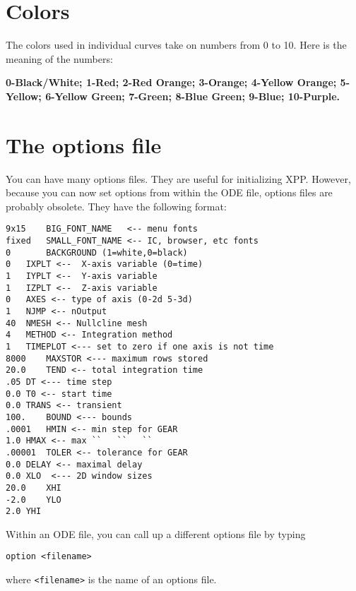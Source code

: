 \documentclass{article}
\newcommand{\bvb}{\begin{verbatim}}
\begin{document}
\section{Colors}
The colors used in individual curves take on numbers from 0 to 10. Here is
the meaning of the numbers:

{\bf 0-Black/White; 1-Red; 2-Red Orange; 3-Orange;
4-Yellow Orange; 5-Yellow; 6-Yellow Green; 7-Green; 8-Blue Green; 9-Blue;
10-Purple.}

\section{The options file}
\label{optfiles}
You can have many options files.  They are useful for initializing
XPP. However, because you can now set options from within the ODE
file, options files are probably obsolete. They have the following format:
\bvb
9x15    BIG_FONT_NAME   <-- menu fonts
fixed   SMALL_FONT_NAME <-- IC, browser, etc fonts
0       BACKGROUND (1=white,0=black)
0	IXPLT <--  X-axis variable (0=time)
1	IYPLT <--  Y-axis variable
1	IZPLT <--  Z-axis variable
0	AXES <-- type of axis (0-2d 5-3d)
1	NJMP <-- nOutput
40	NMESH <-- Nullcline mesh
4	METHOD <-- Integration method
1	TIMEPLOT <--- set to zero if one axis is not time
8000	MAXSTOR <--- maximum rows stored
20.0	TEND <-- total integration time
.05	DT <--- time step
0.0	T0 <-- start time
0.0	TRANS <-- transient
100.	BOUND <--- bounds
.0001	HMIN <-- min step for GEAR
1.0	HMAX <-- max ``   ``   ``
.00001	TOLER <-- tolerance for GEAR
0.0	DELAY <-- maximal delay
0.0	XLO  <--- 2D window sizes
20.0	XHI
-2.0	YLO
2.0	YHI
\end{verbatim}

Within an ODE file, you can call up a different options file by
typing
\bvb
option <filename>
\end{verbatim}
where {\tt <filename>} is the name of an options file.
\end{document}
